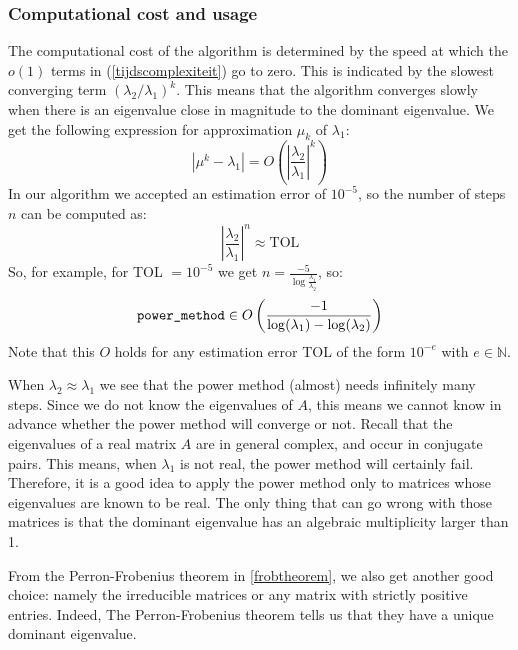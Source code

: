 \documentclass[a4paper,11pt]{report}
\newcommand{\N}{{\mathbb N}}
\begin{document}
\subsubsection{Computational cost and usage}
The computational cost of the algorithm is determined by the speed at which the 
$o(1)$ terms in (\ref{tijdscomplexiteit}) go to zero. This is indicated by the slowest converging term $(\lambda_2/\lambda_1)^k$. This means
that  the algorithm converges slowly when there is an eigenvalue close in magnitude to the dominant eigenvalue. We 
get the following expression for approximation $\mu_k$ of $\lambda_1$:
$$|\mu^k - \lambda_1| = O\left(\left|\frac{\lambda_2}{\lambda_1} \right|^k\right)$$
In our algorithm we accepted an estimation error of $10^{-5}$, so the number of 
steps $n$ can be computed as:
$$\left|\frac{\lambda_2}{\lambda_1} \right|^n \approx\text{TOL}$$
So, for example, for TOL $= 10^{-5}$ we get $n = \frac{-5}{\log{\frac{\lambda_1}{\lambda_2}}}$, so:
$$\text{\texttt{power\_method}} \in O\left(\frac{-1}{\log(\lambda_1) - \log(\lambda_2)}\right)$$
Note that this $O$ holds for any estimation error TOL of the form $10^{-e}$ with $e \in \N$. 

When $\lambda_2 \approx \lambda_1$ we see that the power method (almost) needs infinitely 
many steps. Since we do not know the eigenvalues of $A$, this means 
we cannot know in advance whether the power method will converge or not. Recall that 
the eigenvalues of a real matrix $A$ are in general complex, and occur in 
conjugate pairs. This means, when $\lambda_1$ is not real, 
the power method will certainly fail. Therefore, it is a good idea to apply the 
power method only to matrices whose eigenvalues are known to be real. The only 
thing that can go wrong with those matrices is that the dominant eigenvalue has 
an algebraic multiplicity larger than 1. 

From the Perron-Frobenius theorem in \ref{frobtheorem}, we also get another good choice: namely the irreducible matrices or any matrix with strictly positive entries.
Indeed, The Perron-Frobenius theorem tells us that they have a unique dominant 
eigenvalue.
\end{document}
